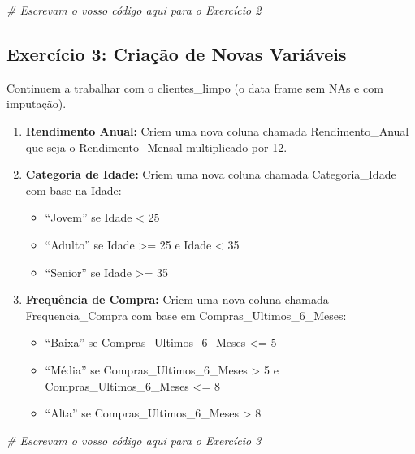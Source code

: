 \documentclass[
]{article}
\newenvironment{Shaded}{\begin{snugshade}}{\end{snugshade}}
\newcommand{\CommentTok}[1]{\textcolor[rgb]{0.56,0.35,0.01}{\textit{#1}}}
\providecommand{\tightlist}{%
  \setlength{\itemsep}{0pt}\setlength{\parskip}{0pt}}
\begin{document}
\begin{Shaded}
\begin{Highlighting}[]
\CommentTok{\# Escrevam o vosso código aqui para o Exercício 2}
\end{Highlighting}
\end{Shaded}

\subsection{\texorpdfstring{\textbf{Exercício 3:} Criação de Novas
Variáveis}{Exercício 3: Criação de Novas Variáveis}}\label{exercuxedcio-3-criauxe7uxe3o-de-novas-variuxe1veis}

Continuem a trabalhar com o clientes\_limpo (o data frame sem NAs e com
imputação).

\begin{enumerate}
\def\labelenumi{\arabic{enumi}.}
\tightlist
\item
  \textbf{Rendimento Anual:} Criem uma nova coluna chamada
  Rendimento\_Anual que seja o Rendimento\_Mensal multiplicado por 12.
\item
  \textbf{Categoria de Idade:} Criem uma nova coluna chamada
  Categoria\_Idade com base na Idade:

  \begin{itemize}
  \tightlist
  \item
    ``Jovem'' se Idade \textless{} 25
  \item
    ``Adulto'' se Idade \textgreater= 25 e Idade \textless{} 35
  \item
    ``Senior'' se Idade \textgreater= 35
  \end{itemize}
\item
  \textbf{Frequência de Compra:} Criem uma nova coluna chamada
  Frequencia\_Compra com base em Compras\_Ultimos\_6\_Meses:

  \begin{itemize}
  \tightlist
  \item
    ``Baixa'' se Compras\_Ultimos\_6\_Meses \textless= 5
  \item
    ``Média'' se Compras\_Ultimos\_6\_Meses \textgreater{} 5 e
    Compras\_Ultimos\_6\_Meses \textless= 8
  \item
    ``Alta'' se Compras\_Ultimos\_6\_Meses \textgreater{} 8
  \end{itemize}
\end{enumerate}

\begin{Shaded}
\begin{Highlighting}[]
\CommentTok{\# Escrevam o vosso código aqui para o Exercício 3}
\end{Highlighting}
\end{Shaded}
\end{document}
